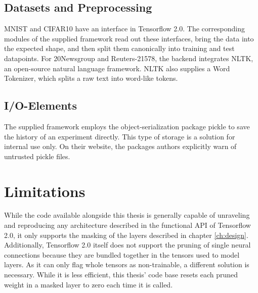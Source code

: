 \subsection{Datasets and Preprocessing}
MNIST and CIFAR10 have an interface in Tensorflow 2.0. The corresponding modules of the supplied framework read out these interfaces, bring the data into the expected shape, and then split them canonically into training and test datapoints. 
For 20Newsgroup and Reuters-21578, the backend integrates NLTK, an open-source natural language framework. NLTK also supplies a Word Tokenizer, which splits a raw text into word-like tokens.\cite{NLTK}
\subsection{I/O-Elements}
The supplied framework employs the object-serialization package pickle to save the history of an experiment directly. This type of storage is a solution for internal use only. On their website, the packages authors explicitly warn of untrusted pickle files.

\section{Limitations}
While the code available alongside this thesis is generally capable of unraveling and reproducing any architecture described in the functional API of Tensorflow 2.0, it only supports the masking of the layers described in chapter \ref{ch:design}. 
Additionally, Tensorflow 2.0 itself does not support the pruning of single neural connections because they are bundled together in the tensors used to model layers. As it can only flag whole tensors as non-trainable, a different solution is necessary. While it is less efficient, this thesis' code base resets each pruned weight in a masked layer to zero each time it is called.